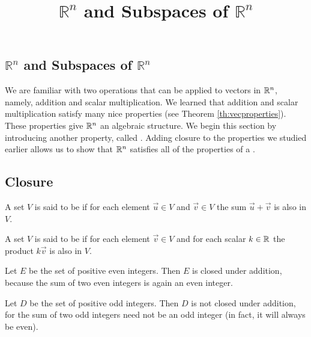 \documentclass{ximera}
\title{$\mathbb{R}^n$ and Subspaces of $\mathbb{R}^n$} \license{CC BY-NC-SA 4.0}
\begin{document}
\begin{abstract}
\end{abstract}

\maketitle

\begin{onlineOnly}
\section*{$\mathbb{R}^n$ and Subspaces of $\mathbb{R}^n$}
\end{onlineOnly}


We are familiar with two operations that can be applied to vectors in $\mathbb{R}^n$, namely, addition and scalar multiplication. We learned that addition and scalar multiplication satisfy many nice properties (see Theorem \ref{th:vecproperties}). These properties give $\mathbb{R}^n$ an algebraic structure.  We begin this section by introducing another property, called .  Adding closure to the properties we studied earlier allows us to show that $\mathbb{R}^n$ satisfies all of the properties of a .  

\subsection*{Closure}
 \begin{definition} \label{def:closedunderaddition}
  A set $V$ is said to be  if for each element $\vec{u} \in V$ and $\vec{v} \in V$ the sum $\vec{u}+\vec{v}$ is also in $V$.
\end{definition}

  \begin{definition} \label{def:closedunderscalarmult}
  A set $V$ is said to be  if for each element $\vec{v} \in V$  and for each scalar $k \in \mathbb{R}$ the product $k\vec{v}$ is also in $V$.
\end{definition}


\begin{example}\label{ex:posevenint}
Let $E$ be the set of positive even integers.  Then $E$ is closed under addition, because the sum of two even integers is again an even integer.
\end{example}

\begin{example}\label{ex:posoddint}
Let $D$ be the set of positive odd integers.  Then $D$ is not closed under addition, for the sum of two odd integers need not be an odd integer (in fact, it will always be even).
\end{example}
\end{document}

